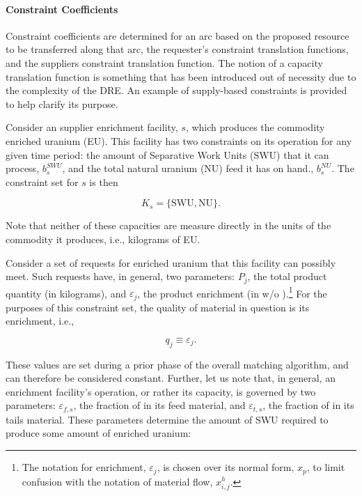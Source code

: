 \paragraph{Constraint Coefficients}

Constraint coefficients are determined for an arc based on the proposed resource
to be transferred along that arc, the requester's constraint translation
functions, and the suppliers constraint translation function. The notion of a
capacity translation function is something that has been introduced out of
necessity due to the complexity of the DRE. An example of supply-based
constraints is provided to help clarify its purpose.

Consider an supplier enrichment facility, $s$, which produces the commodity
enriched uranium (EU). This facility has two constraints on its operation for
any given time period: the amount of Separative Work Units (SWU) that it can
process, $b_{s}^{SWU}$, and the total natural uranium (NU) feed it has on hand.,
$b_{s}^{NU}$. The constraint set for $s$ is then
 
\begin{equation}\label{eqs:enr-constr-commods}
  K_{s} = \{ \mbox{SWU}, \mbox{NU} \}.
\end{equation}

Note that neither of these capacities are measure directly in the units of the
commodity it produces, i.e., kilograms of EU.

Consider a set of requests for enriched uranium that this facility can possibly
meet. Such requests have, in general, two parameters: $P_{j}$, the total product
quantity (in kilograms), and $\varepsilon_{j}$, the product enrichment (in w/o
).\footnote{The notation for enrichment, $\varepsilon_{j}$, is
  chosen over its normal form, $x_p$, to limit confusion with the notation of
  material flow, $x^h_{i,j}$.}  For the purposes of this constraint set, the
quality of material in question is its enrichment, i.e.,

\begin{equation}\label{eqs:enr-q-swu}
  q_{j} \equiv \varepsilon_{j}.
\end{equation}

These values are set during a prior phase of the overall matching algorithm, and
can therefore be considered constant. Further, let us note that, in general, an
enrichment facility's operation, or rather its capacity, is governed by two
parameters: $\varepsilon_{f,s}$, the fraction of  in its feed
material, and $\varepsilon_{t,s}$, the fraction of  in its tails
material. These parameters determine the amount of SWU required to produce some
amount of enriched uranium:

